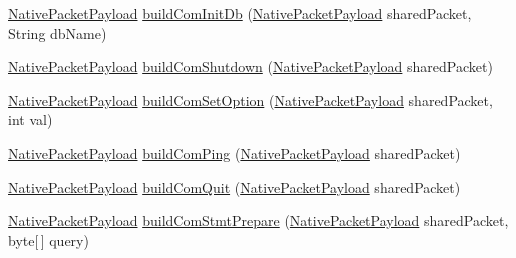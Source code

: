 \begin{DoxyCompactItemize}
\item 
\mbox{\hyperlink{classcom_1_1mysql_1_1cj_1_1protocol_1_1a_1_1_native_packet_payload}{Native\+Packet\+Payload}} \mbox{\hyperlink{classcom_1_1mysql_1_1cj_1_1protocol_1_1a_1_1_native_message_builder_af7d5c3db7a4e2be1ca5818cdbb096197}{build\+Com\+Init\+Db}} (\mbox{\hyperlink{classcom_1_1mysql_1_1cj_1_1protocol_1_1a_1_1_native_packet_payload}{Native\+Packet\+Payload}} shared\+Packet, String db\+Name)
\item 
\mbox{\hyperlink{classcom_1_1mysql_1_1cj_1_1protocol_1_1a_1_1_native_packet_payload}{Native\+Packet\+Payload}} \mbox{\hyperlink{classcom_1_1mysql_1_1cj_1_1protocol_1_1a_1_1_native_message_builder_af75a2d2a26bf9bfe25be05405ce19e50}{build\+Com\+Shutdown}} (\mbox{\hyperlink{classcom_1_1mysql_1_1cj_1_1protocol_1_1a_1_1_native_packet_payload}{Native\+Packet\+Payload}} shared\+Packet)
\item 
\mbox{\hyperlink{classcom_1_1mysql_1_1cj_1_1protocol_1_1a_1_1_native_packet_payload}{Native\+Packet\+Payload}} \mbox{\hyperlink{classcom_1_1mysql_1_1cj_1_1protocol_1_1a_1_1_native_message_builder_aca9d3bf6bdfa9d634a9e937c5c354a4c}{build\+Com\+Set\+Option}} (\mbox{\hyperlink{classcom_1_1mysql_1_1cj_1_1protocol_1_1a_1_1_native_packet_payload}{Native\+Packet\+Payload}} shared\+Packet, int val)
\item 
\mbox{\hyperlink{classcom_1_1mysql_1_1cj_1_1protocol_1_1a_1_1_native_packet_payload}{Native\+Packet\+Payload}} \mbox{\hyperlink{classcom_1_1mysql_1_1cj_1_1protocol_1_1a_1_1_native_message_builder_a0b94a476c61cd2015d653ae9a0a0bfc3}{build\+Com\+Ping}} (\mbox{\hyperlink{classcom_1_1mysql_1_1cj_1_1protocol_1_1a_1_1_native_packet_payload}{Native\+Packet\+Payload}} shared\+Packet)
\item 
\mbox{\hyperlink{classcom_1_1mysql_1_1cj_1_1protocol_1_1a_1_1_native_packet_payload}{Native\+Packet\+Payload}} \mbox{\hyperlink{classcom_1_1mysql_1_1cj_1_1protocol_1_1a_1_1_native_message_builder_ac3a9aad3a165871de1c7f1119c69a7b2}{build\+Com\+Quit}} (\mbox{\hyperlink{classcom_1_1mysql_1_1cj_1_1protocol_1_1a_1_1_native_packet_payload}{Native\+Packet\+Payload}} shared\+Packet)
\item 
\mbox{\hyperlink{classcom_1_1mysql_1_1cj_1_1protocol_1_1a_1_1_native_packet_payload}{Native\+Packet\+Payload}} \mbox{\hyperlink{classcom_1_1mysql_1_1cj_1_1protocol_1_1a_1_1_native_message_builder_aa6ebc1a4c22f4f5bb14baf1148cc37d7}{build\+Com\+Stmt\+Prepare}} (\mbox{\hyperlink{classcom_1_1mysql_1_1cj_1_1protocol_1_1a_1_1_native_packet_payload}{Native\+Packet\+Payload}} shared\+Packet, byte\mbox{[}$\,$\mbox{]} query)

\end{DoxyCompactItemize}
